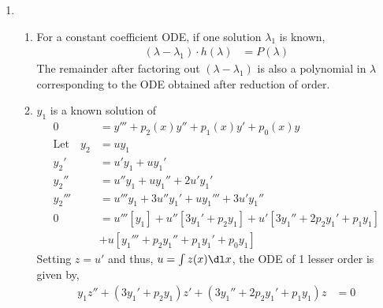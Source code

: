 \begin{enumerate}
    \item
          \begin{enumerate}
              \item For a constant coefficient ODE, if one solution $ \lambda_{1} $ is known,
                    \begin{align}
                        (\lambda - \lambda_{1}) \cdot h(\lambda) & = P(\lambda)
                    \end{align}
                    The remainder after factoring out $ (\lambda - \lambda_{1}) $ is also
                    a polynomial in $ \lambda $ corresponding to the ODE obtained after
                    reduction of order.
              \item $ y_{1} $ is a known solution of
                    \begin{align}
                        0                      & = y''' + p_{2}(x)y'' + p_{1}(x)y' + p_{0}(x)y \\
                        \text{Let} \quad y_{2} & = uy_{1}                                      \\
                        y_{2}'                 & = u'y_{1} + uy_{1}'                           \\
                        y_{2}''                & = u''y_{1} + uy_{1}'' + 2u'y_{1}'             \\
                        y_{2}'''               & = u'''y_{1} + 3u''y_{1}' + uy_{1}'''
                        + 3u'y_{1}''                                                           \\
                        0                      & = u'''[y_{1}] + u''[3y_{1}' + p_{2}y_{1}]
                        + u'[3y_{1}'' + 2p_{2}y_{1}' + p_{1}y_{1}]  \nonumber                  \\
                                               & + u[y_{1}''' + p_{2}y_{1}'' + p_{1}y_{1}'
                        + p_{0}y_{1}]
                    \end{align}
                    Setting $ z = u' $ and thus, $ u = \int z(x) \dl x $, the ODE of 1 lesser
                    order is given by,
                    \begin{align}
                        y_{1}z'' + (3y_{1}' + p_{2}y_{1})z' + (3y_{1}'' + 2p_{2}y_{1}'
                        + p_{1}y_{1})z & = 0
                    \end{align}


\end{enumerate}
\end{enumerate}
